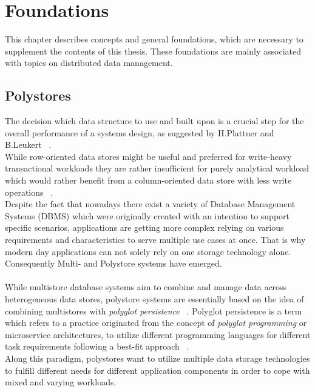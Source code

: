 \chapter{Foundations}
\label{c:Foundation}

This chapter describes concepts and general foundations, which are necessary to supplement 
the contents of this thesis. These foundations are mainly associated with topics on distributed data management.


\section{Polystores}

The decision which data structure to use and built upon is a crucial step for the overall performance of a systems design, as suggested by
H.Plattner and B.Leukert ~\cite{plattner2015}.\\
While row-oriented data stores might be useful and preferred for write-heavy transactional 
workloads they are rather insufficient for purely analytical workload which would rather benefit from a
column-oriented data store with less write operations ~\cite{sigmond2008}.\\

Despite the fact that nowadays there exist a variety of Database Management Systems (DBMS) which were originally created with an intention to
support specific scenarios,
applications are getting more complex relying on various requirements and characteristics 
to serve multiple use cases at once.
That is why modern day applications can not solely rely on one storage technology alone. 
Consequently Multi- and Polystore systems have emerged. \\
\\
While multistore database systems aim to combine and manage data across heterogeneous data stores,
polystore systems are essentially based on the idea of combining multistores with
\textit{polyglot persistence} ~\cite{polypheny2020}.
Polyglot persistence is a term which refers to a practice originated from the concept 
of \textit{polyglot programming} or microservice architectures, to utilize different 
programming languages for different task requirements following a best-fit approach ~\cite{fowler2011}. \\
Along this paradigm, polystores want to utilize multiple data storage technologies to
fulfill different needs for different application components in order to cope
with mixed and varying workloads.


